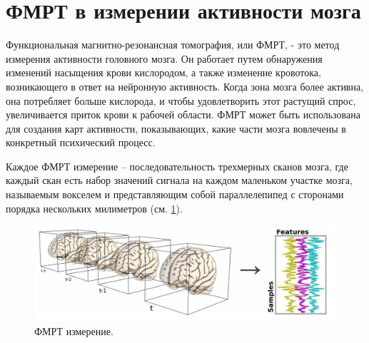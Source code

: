 \documentclass[pdftex,ptm,12pt,a4paper]{report}
\theoremstyle{definition}
\begin{document}
\section{ФМРТ в измерении активности мозга}

Функциональная магнитно-резонансная томография, или ФМРТ, - это метод измерения активности головного мозга. Он работает путем обнаружения изменений насыщения крови кислородом, а также изменение кровотока, возникающего в ответ на нейронную активность. Когда зона мозга более активна, она потребляет больше кислорода, и чтобы удовлетворить этот растущий спрос, увеличивается приток крови к рабочей области. ФМРТ может быть использована для создания карт активности, показывающих, какие части мозга вовлечены в конкретный психический процесс.

Каждое ФМРТ измерение -- последовательность трехмерных сканов мозга, где каждый скан есть набор значений сигнала на каждом маленьком участке мозга, называемым вокселем и представляющим собой параллелепипед с сторонами порядка нескольких милиметров (см. \ref{fmri_result}).

\begin{figure}[h]
\includegraphics[scale=0.25]{images/fmrt_result.png}
\centering
\caption{ФМРТ измерение.}
\label{fmri_result}
\end{figure}
\end{document}
